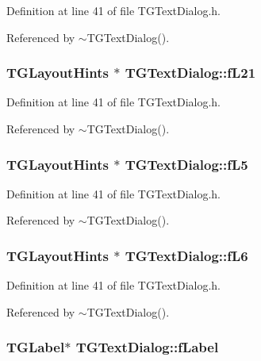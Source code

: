 Definition at line 41 of file TGTextDialog.h.



Referenced by $\sim$TGTextDialog().

\subsubsection[{fL21}]{\setlength{\rightskip}{0pt plus 5cm}TGLayoutHints $\ast$ {\bf TGTextDialog::fL21}\hspace{0.3cm}{\ttfamily  [protected]}}\label{classTGTextDialog_a53a7e42e209faded453d0c3df900e531}


Definition at line 41 of file TGTextDialog.h.



Referenced by $\sim$TGTextDialog().

\subsubsection[{fL5}]{\setlength{\rightskip}{0pt plus 5cm}TGLayoutHints $\ast$ {\bf TGTextDialog::fL5}\hspace{0.3cm}{\ttfamily  [protected]}}\label{classTGTextDialog_acf68738a98af7d27803a0928861bcffa}


Definition at line 41 of file TGTextDialog.h.



Referenced by $\sim$TGTextDialog().

\subsubsection[{fL6}]{\setlength{\rightskip}{0pt plus 5cm}TGLayoutHints $\ast$ {\bf TGTextDialog::fL6}\hspace{0.3cm}{\ttfamily  [protected]}}\label{classTGTextDialog_a383fb9fbb392650cf07c9047d840d583}


Definition at line 41 of file TGTextDialog.h.



Referenced by $\sim$TGTextDialog().

\subsubsection[{fLabel}]{\setlength{\rightskip}{0pt plus 5cm}TGLabel$\ast$ {\bf TGTextDialog::fLabel}\hspace{0.3cm}{\ttfamily  [protected]}}\label{classTGTextDialog_a3894c9670b475f813b99e6d1f4ecff7b}


